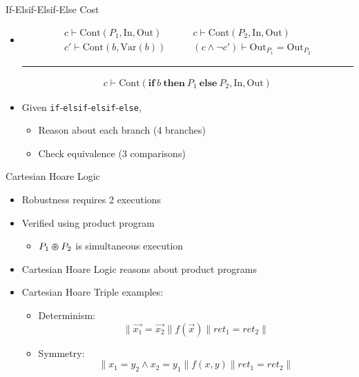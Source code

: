 \documentclass[usenames,dvipsnames]{beamer}
\begin{document}
\begin{frame}[fragile]{If-Elsif-Elsif-Else Cost}
    \begin{itemize}
        \item<1->
            \begin{align*}
                c \vdash \mathrm{Cont}(P_{1}, \mathrm{In}, \mathrm{Out}) &\qquad c \vdash \mathrm{Cont}(P_{2}, \mathrm{In}, \mathrm{Out})\\
                c' \vdash \mathrm{Cont}(b, \mathrm{Var}(b)) &\qquad (c \wedge \neg c') \vdash \mathrm{Out}_{P_{1}} = \mathrm{Out}_{P_{2}}
            \end{align*}
            \vspace{-2\baselineskip}
            \begin{center}
                \rule{0.85\textwidth}{0.5pt}
            \end{center}
            \vspace{-0.75\baselineskip}
            \begin{align*}
                c \vdash \mathrm{Cont}(\mathbf{if}\: b\: \mathbf{then}\: P_{1}\: \mathbf{else}\: P_{2}, \mathrm{In}, \mathrm{Out})
            \end{align*}
        \item<2-> Given \verb!if!-\verb!elsif!-\verb!elsif!-\verb!else!,
            \begin{itemize}
                \item<3-> Reason about each branch (4 branches)
                \item<4-> Check equivalence (3 comparisons)
            \end{itemize}
    \end{itemize}
\end{frame}

\begin{frame}{Cartesian Hoare Logic}
    \begin{itemize}
        \item<1-> Robustness requires 2 executions
        \item<2-> Verified using product program
            \begin{itemize}
                \item<3-> \(P_{1} \varoast P_{2}\) is simultaneous execution
            \end{itemize}
        \item<4-> Cartesian Hoare Logic reasons about product programs
        \item<5-> Cartesian Hoare Triple examples:
            \begin{itemize}
                \item<6-> Determinism: \[\|\vec{x_{1}} = \vec{x_{2}}\|f(\vec{x})\|ret_{1} = ret_{2}\|\]
                \item<7-> Symmetry: \[\|x_{1} = y_{2} \wedge x_{2} = y_{1}\|f(x,y)\|ret_{1} = ret_{2}\|\]
            \end{itemize}
    \end{itemize}
\end{frame}
\end{document}
